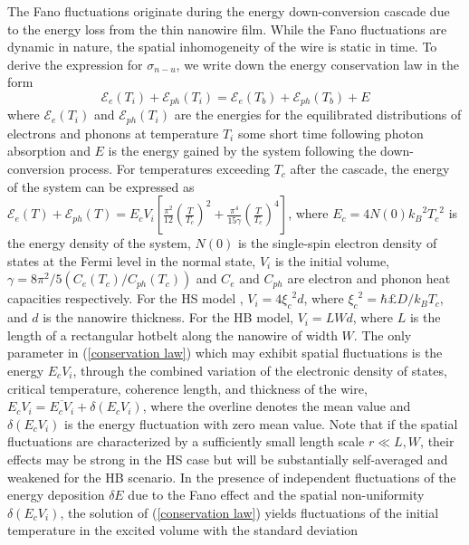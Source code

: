 \documentclass[%
reprint,
 amsmath,amssymb,
aps,
pra,
]{revtex4-1}
\begin{document}
\quad The Fano fluctuations originate during the energy down-conversion cascade due to the energy loss from the thin nanowire film. While the Fano fluctuations are dynamic in nature, the spatial inhomogeneity of the wire is static in time. To derive the expression for \(\sigma_{n-u}\), we write down the energy conservation law \cite{vodolazov_single-photon_2017} in the form
\begin{equation}\label{conservation law}
\mathcal{E}_e(T_i) + \mathcal{E}_{ph}(T_i) = \mathcal{E}_e(T_b) + \mathcal{E}_{ph}(T_b) + E
\end{equation}
where \(\mathcal{E}_e(T_i)\) and \(\mathcal{E}_{ph}(T_i)\) are the energies for the equilibrated distributions of electrons and phonons at temperature \(T_i\) some short time following photon absorption and \(E\) is the energy gained by the system following the down-conversion process. For temperatures exceeding \(T_c\) after the cascade, the energy of the system can be expressed as \(\displaystyle{\mathcal{E}_e(T) + \mathcal{E}_{ph}(T) = {E}_cV_i\left[\frac{\pi^2}{12}\left(\frac{T}{T_c}\right)^2 + \frac{\pi^4}{15\gamma}\left(\frac{T}{T_c}\right)^4\right]}\), where \({E}_c=4N(0){k_B}^2{T_c}^2\) is the energy density of the system, \(N(0)\) is the single-spin electron density of states at the Fermi level in the normal state, \(V_i\) is the initial volume, \(\gamma=8\pi^2/5\left(C_e(T_c)/C_{ph}(T_c)\right)\) and \(C_e\) and \(C_{ph}\) are electron and phonon heat capacities respectively. For the HS model \cite{vodolazov_single-photon_2017}, \(V_i = 4{\xi_c}^2d\), where \({\xi_c}^2=\hbar£D/k_BT_c\), and \(d\) is the nanowire thickness. For the HB model, \(V_i = LWd\), where \(L\) is the length of a rectangular hotbelt along the nanowire of width \(W\). The only parameter in (\ref{conservation law}) which may exhibit spatial fluctuations is the energy \(E_cV_i\), through the combined variation of the electronic density of states, critical temperature, coherence length, and thickness of the wire, \(E_cV_i = \overline{E_cV_i} + \delta\left(E_cV_i\right)\), where the overline denotes the mean value and \(\delta\left(E_cV_i\right)\) is the energy fluctuation with zero mean value. Note that if the spatial fluctuations are characterized by a sufficiently small length scale \(r \ll L,W\), their effects may be strong in the HS case but will be substantially self-averaged and weakened for the HB scenario. In the presence of independent fluctuations of the energy deposition \(\delta E \) due to the Fano effect and the spatial non-uniformity \(\delta\left(E_cV_i\right)\), the solution of (\ref{conservation law}) yields fluctuations of the initial temperature in the excited volume with the standard deviation \cite{kozorezov_fano_2017}
\end{document}
